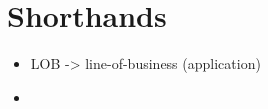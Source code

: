 \section{Shorthands}
\begin{itemize}
	\item LOB -> line-of-business (application)
	\item 
\end{itemize}